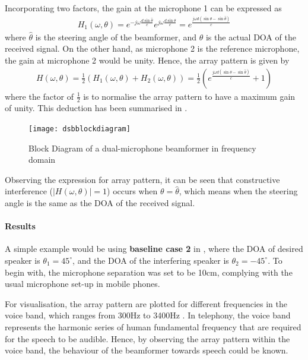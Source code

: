 \documentclass[a4paper,twoside,12pt,hidelinks]{article}
\begin{document}
Incorporating two factors, the gain at the microphone 1 can be expressed as
\begin{align}
H_1(\omega,\theta)=e^{-j\omega\frac{d\sin\hat{\theta}}{c}}e^{j\omega\frac{d\sin\theta}{c}}=e^{\frac{j\omega d(\sin\theta-\sin\hat{\theta})}{c}}
\end{align}
where $\hat{\theta}$ is the steering angle of the beamformer, and $\theta$ is the actual DOA of the received signal. On the other hand, as microphone 2 is the reference microphone, the gain at microphone 2 would be unity. Hence, the array pattern is given by 
\begin{align}
H(\omega,\theta)=\frac{1}{2}(H_1(\omega,\theta)+H_2(\omega,\theta))=\frac{1}{2}\left(e^{\frac{j\omega d(\sin\theta-\sin\hat{\theta})}{c}}+1\right)
\end{align}
where the factor of $\frac{1}{2}$ is to normalise the array pattern to have a maximum gain of unity. This deduction has been summarised in .

\begin{figure}[H]
\centering
\texttt{[image: dsbblockdiagram]}
\caption{Block Diagram of a dual-microphone beamformer in frequency domain}
\label{fig:dsbblock}
\end{figure}

Observing the expression for array pattern, it can be seen that constructive interference ($|H(\omega,\theta)|=1$) occurs when $\theta=\hat{\theta}$, which means when the steering angle is the same as the DOA of the received signal. 

\paragraph{Results}
A simple example would be using \textbf{baseline case 2} in , where the DOA of desired speaker is $\theta_1 = 45^\circ$, and the DOA of the interfering speaker is $\theta_2 = -45^\circ$. To begin with, the microphone separation was set to be 10cm, complying with the usual microphone set-up in mobile phones. 

For visualisation, the array pattern are plotted for different frequencies in the voice band, which ranges from 300Hz to 3400Hz \cite{Freeman2005FundamentalsTelecommunications}. In telephony, the voice band represents the harmonic series of human fundamental frequency that are required for the speech to be audible. Hence, by observing the array pattern within the voice band, the behaviour of the beamformer towards speech could be known.
\end{document}
